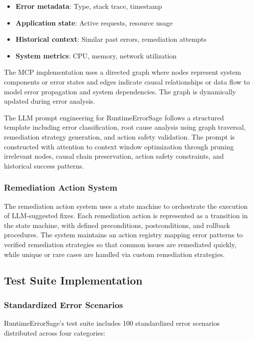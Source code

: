 \begin{itemize}
\item \textbf{Error metadata}: Type, stack trace, timestamp
\item \textbf{Application state}: Active requests, resource usage
\item \textbf{Historical context}: Similar past errors, remediation attempts
\item \textbf{System metrics}: CPU, memory, network utilization
\end{itemize}

The MCP implementation uses a directed graph where nodes represent system components or error states and edges indicate causal relationships or data flow to model error propagation and system dependencies. The graph is dynamically updated during error analysis.

The LLM prompt engineering for RuntimeErrorSage follows a structured template including error classification, root cause analysis using graph traversal, remediation strategy generation, and action safety validation. The prompt is constructed with attention to context window optimization through pruning irrelevant nodes, causal chain preservation, action safety constraints, and historical success patterns.

\subsubsection{Remediation Action System}
The remediation action system uses a state machine to orchestrate the execution of LLM-suggested fixes. Each remediation action is represented as a transition in the state machine, with defined preconditions, postconditions, and rollback procedures. The system maintains an action registry mapping error patterns to verified remediation strategies so that common issues are remediated quickly, while unique or rare cases are handled via custom remediation strategies.

\subsection{Test Suite Implementation}

\subsubsection{Standardized Error Scenarios}
RuntimeErrorSage's test suite includes 100 standardized error scenarios distributed across four categories:

